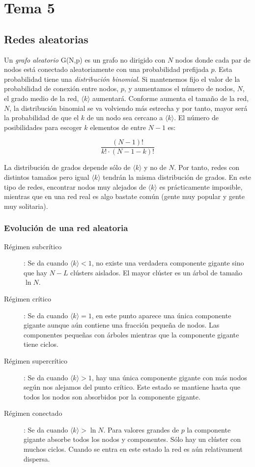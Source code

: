 \documentclass[10pt,spanish, landscape, twocolumn]{article}
\begin{document}
\newpage
\section{\textcolor{temacinco}{Tema 5}}
\subsection{\textcolor{temacinco}Redes aleatorias}
Un \textit{\textcolor{temacinco}{grafo aleatorio}} G(N,p) es un grafo no dirigido con $N$ nodos donde cada par de nodos está conectado aleatoriamente con una probabilidad prefijada $p$. Esta probabilidad tiene una \textit{\textcolor{temacinco}{distribución binomial}}. Si mantenemos fijo el valor de la probabilidad de conexión entre nodos, $p$, y aumentamos el número de nodos, $N$, el grado medio de la red, $\langle k \rangle$ aumentará. Conforme aumenta el tamaño de la red, $N$, la distribución binomial se va volviendo más estrecha y por tanto, mayor será la probabilidad de que el $k$ de un nodo sea cercano a $\langle k \rangle$. El número de posibilidades para escoger $k$ elementos de entre $N-1$ es:

\begin{displaymath}
    \frac{(N-1)!}{k! \cdot (N - 1 - k)!}
\end{displaymath}

La distribución de grados depende sólo de $\langle k \rangle$ y no de $N$. Por tanto, redes con distintos tamaños pero igual $\langle k \rangle$ tendrán la misma distribución de grados. En este tipo de redes, encontrar nodos muy alejados de $\langle k \rangle$ es prácticamente imposible, mientras que en una red real es algo bastate común (gente muy popular y gente muy solitaria).

\subsubsection{\textcolor{temacinco}Evolución de una red aleatoria}
\begin{description}
    \item[Régimen subcrítico]: Se da cuando $\langle k \rangle < 1$, no existe una verdadera componente gigante sino que hay $N-L$ clústers aislados. El mayor clúster es un árbol de tamaño $\ln N$.
    \item[Régimen crítico]: Se da cuando $\langle k \rangle = 1$, en este punto aparece una única componente gigante aunque aún contiene una fracción pequeña de nodos. Las componentes pequeñas con árboles mientras que la componente gigante tiene ciclos.
    \item[Régimen supercrítico]: Se da cuando $\langle k \rangle > 1$, hay una única componente gigante con más nodos según nos alejamos del punto crítico. Este estado se mantiene hasta que todos los nodos son absorbidos por la componente gigante.
    \item[Régimen conectado]: Se da cuando $\langle k \rangle  > \ln N$. Para valores grandes de $p$ la componente gigante absorbe todos los nodos y componentes. Sólo hay un clúster con muchos ciclos. Cuando se entra en este estado la red es aún relativament dispersa.
\end{description}
\end{document}
